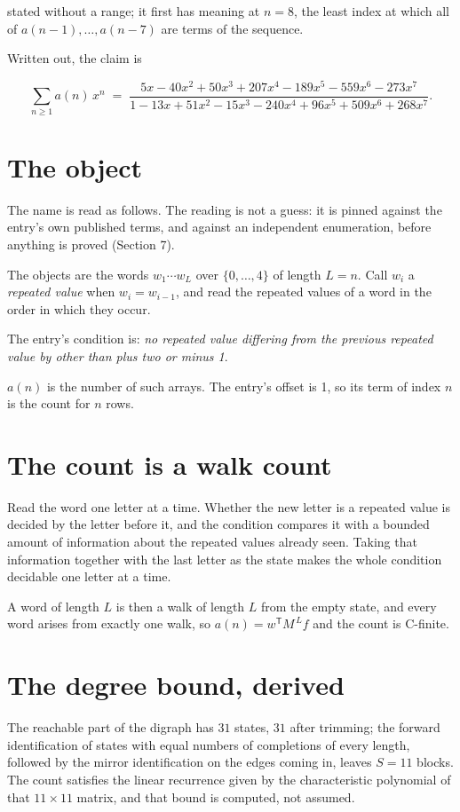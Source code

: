\documentclass[11pt]{article}
\theoremstyle{definition}
\begin{document}
stated without a range; it first has meaning at $n = 8$, the least index at which all of $a(n-1),\dots,a(n-7)$ are terms of the sequence.

Written out, the claim is

\[\sum_{n \ge 1} a(n)\,x^n \;=\; \frac{5x - 40x^{2} + 50x^{3} + 207x^{4} - 189x^{5} - 559x^{6} - 273x^{7}}{1 - 13x + 51x^{2} - 15x^{3} - 240x^{4} + 96x^{5} + 509x^{6} + 268x^{7}}.\]

\section{The object}

The name is read as follows. The reading is not a guess: it is pinned against the entry's own published terms, and against an independent enumeration, before anything is proved (Section 7).

The objects are the words $w_1\cdots w_L$ over $\{0,\dots,4\}$ of length $L = n$. Call $w_i$ a {\itshape repeated value} when $w_i = w_{i-1}$, and read the repeated values of a word in the order in which they occur.

The entry's condition is: {\itshape no repeated value differing from the previous repeated value by other than plus two or minus 1}.

$a(n)$ is the number of such arrays. The entry's offset is 1, so its term of index $n$ is the count for $n$ rows.

\section{The count is a walk count}

Read the word one letter at a time. Whether the new letter is a repeated value is decided by the letter before it, and the condition compares it with a bounded amount of information about the repeated values already seen. Taking that information together with the last letter as the state makes the whole condition decidable one letter at a time.

A word of length $L$ is then a walk of length $L$ from the empty state, and every word arises from exactly one walk, so $a(n) = w^{\mathsf T}M^{\,L}f$ and the count is C-finite.

\section{The degree bound, derived}

The reachable part of the digraph has $31$ states, $31$ after trimming; the forward identification of states with equal numbers of completions of every length, followed by the mirror identification on the edges coming in, leaves $S = 11$ blocks. The count satisfies the linear recurrence given by the characteristic polynomial of that $11\times11$ matrix, and that bound is computed, not assumed.
\end{document}
